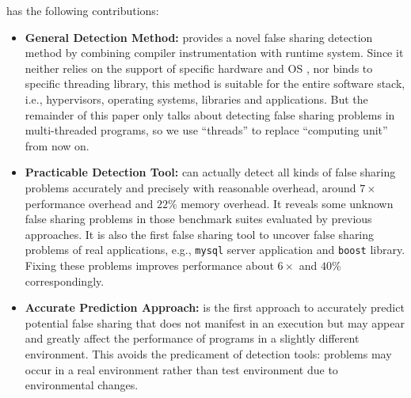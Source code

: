 \Predator{} has the following contributions:
\begin{itemize}
\item
\textbf{General Detection Method:}\Predator{} provides a novel false sharing detection method by
combining compiler instrumentation with runtime system.
Since it neither relies on the support of specific hardware and OS ,
nor binds to specific threading library, 
this method is suitable for the entire software stack, 
i.e., hypervisors, operating systems, libraries and applications.
But the remainder of this paper only talks about detecting false sharing problems in multi-threaded 
programs, so we use ``threads'' to replace ``computing unit'' from now on.

\item
\textbf{Practicable Detection Tool:} \Predator{} can actually detect all kinds of false sharing 
problems accurately and precisely 
with reasonable overhead, around $7\times$ performance overhead and $22\%$ memory overhead. 
It reveals some unknown false sharing problems in those benchmark suites evaluated by 
previous approaches.
It is also the first false sharing tool to uncover false sharing problems of real applications, e.g.,
\texttt{mysql} server application and \texttt{boost} library. Fixing these problems 
improves performance about $6\times$ and $40\%$ correspondingly.

\item
\textbf{Accurate Prediction Approach:}\Predator{} is the first approach to accurately predict potential false sharing that does
not manifest in an execution but may appear and greatly affect the performance of programs 
in a slightly different environment. 
This avoids the predicament of detection tools: problems may occur in a real
environment rather than test environment due to environmental changes. 


\end{itemize}
